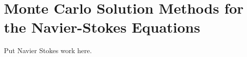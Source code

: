 \chapter{Monte Carlo Solution Methods for the Navier-Stokes Equations}
\label{ch:mc_ns_solutions}

Put Navier Stokes work here.
